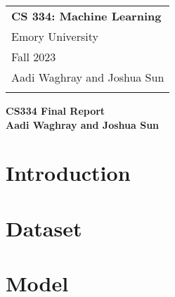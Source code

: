 \documentclass[12pt]{article}
\begin{document}
\thispagestyle{empty}

\begin{tabular}{p{10.5cm}}
    {\large \bf CS 334: Machine Learning} \\
    Emory University                      \\ Fall 2023  \\ Aadi Waghray and Joshua Sun\\
    \bottomrule
    \\
\end{tabular}

\vspace*{0.3cm}

\begin{center}
    {\Large \bf CS334 Final Report }\\ %
    \vspace*{0.02cm}
    {\bf Aadi Waghray and Joshua Sun}
\end{center}

\vspace{0.4cm}

\section*{Introduction}


\section*{Dataset}


\section*{Model}


\newpage
\nocite{*}
\printbibliography
\end{document}

